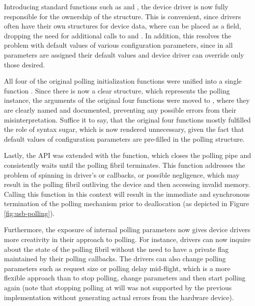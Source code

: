 Introducing standard functions such as  and
, the device driver is now fully responsible for the
ownership of the structure. This is convenient, since drivers often have their
own structures for device data, where  can be placed as a
field, dropping the need for additional calls to  and
. In addition, this resolves the problem with default values of
various configuration parameters, since in  all
parameters are assigned their default values and device driver can override only
those desired.

All four of the original polling initialization functions were unified into a
single function . Since there is now a clear structure,
which represents the polling instance, the arguments of the original four
functions were moved to , where they are clearly named and
documented, preventing any possible errors from their misinterpretation. Suffice
it to say, that the original four functions mostly fulfilled the role of syntax
sugar, which is now rendered unnecessary, given the fact that default values of
configuration parameters are pre-filled in the polling structure.

Lastly, the API was extended with the  function, which
closes the polling pipe and consistently waits until the polling fibril
terminates. This function addresses the problem of spinning in driver's
 or  callbacks, or possible negligence,
which may result in the polling fibril outliving the device and then accessing
invalid memory. Calling this function in this context will result in the
immediate and synchronous termination of the polling mechanism prior to
deallocation (as depicted in Figure \ref{fig:usb-polling}).

Furthermore, the exposure of internal polling parameters now gives device
drivers more creativity in their approach to polling. For instance, drivers can
now inquire about the state of the polling fibril without the need to have a
private flag maintained by their polling callbacks. The drivers can also change
polling parameters such as request size or polling delay mid-flight, which is a
more flexible approach than to stop polling, change parameters and then start
polling again (note that stopping polling at will was not supported by the
previous implementation without generating actual errors from the hardware
device).

